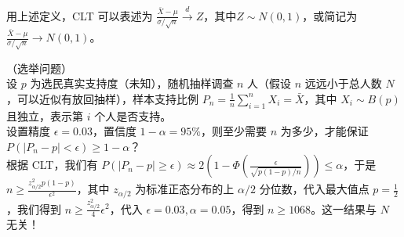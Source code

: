 \documentclass[../main.tex]{subfiles}
\begin{document}
用上述定义，CLT 可以表述为 $\frac{\bar X-\mu}{\sigma/\sqrt n}\overset{d}{\rightarrow}Z$，其中$Z\sim N(0,1)$，或简记为 $\frac{\bar X-\mu}{\sigma/\sqrt n}\rightarrow N(0,1)$。

\begin{example}
    （选举问题）\\
    设 $p$ 为选民真实支持度（未知），随机抽样调查 $n$ 人（假设 $n$ 远远小于总人数 $N$，可以近似有放回抽样），样本支持比例 $P_n=\frac1n\sum_{i=1}^nX_i=\bar X$，其中 $X_i\sim B(p)$ 且独立，表示第 $i$ 个人是否支持。\\
    设置精度 $\epsilon=0.03$，置信度 $1-\alpha=95\%$，则至少需要 $n$ 为多少，才能保证 $P(|P_n-p|<\epsilon)\geq1-\alpha$？\\
    根据 CLT，我们有 $P(|P_n-p|\geq\epsilon)\approx2\left(1-\Phi(\frac\epsilon{\sqrt{p(1-p)/n}})\right)\leq\alpha$，于是 $n\geq\frac{z_{\alpha/2}^2p(1-p)}{\epsilon^2}$，其中 $z_{\alpha/2}$ 为标准正态分布的上 $\alpha/2$ 分位数，代入最大值点 $p=\frac12$，我们得到 $n\geq\frac{z_{\alpha/2}^2}4\epsilon^2$，代入 $\epsilon=0.03,\alpha=0.05$，得到 $n\geq1068$。这一结果与 $N$ 无关！
\end{example}
\end{document}
